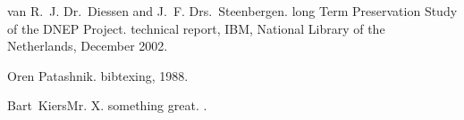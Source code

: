\newcommand{\noopsort}[1]{} \newcommand{\singleletter}[1]{#1} 
\begin{thebibliography}{1}

van R.~J. Dr.~Diessen and J.~F. Drs.~Steenbergen.
\newblock long {T}erm {P}reservation {S}tudy of the {DNEP} {P}roject.
\newblock technical report, IBM, National Library of the Netherlands, December 2002.

Oren Patashnik.
\newblock bibtexing, 1988.

Bart~KiersMr. X.
\newblock something great.
.

\end{thebibliography}
